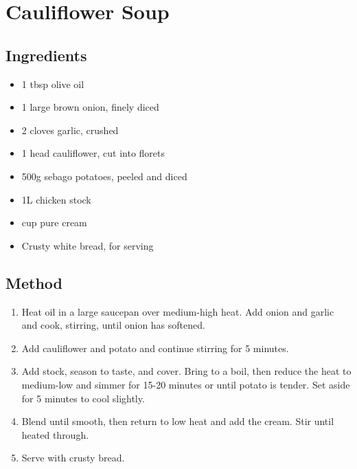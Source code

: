 \clearpage
\section{Cauliflower Soup}


\subsection{Ingredients}

\begin{itemize}
	\item 1 tbsp olive oil
	\item 1 large brown onion, finely diced
	\item 2 cloves garlic, crushed
	\item 1 head cauliflower, cut into florets
	\item 500g sebago potatoes, peeled and diced
	\item 1L chicken stock
	\item {} cup pure cream
	\item Crusty white bread, for serving
\end{itemize}

\subsection{Method}

\begin{enumerate}
	\item Heat oil in a large saucepan over medium-high heat. Add onion and garlic and cook, stirring, until onion has softened.
	\item Add cauliflower and potato and continue stirring for 5 minutes.
	\item Add stock, season to taste, and cover. Bring to a boil, then reduce the heat to medium-low and simmer for 15-20 minutes or until potato is tender. Set aside for 5 minutes to cool slightly.
	\item Blend until smooth, then return to low heat and add the cream. Stir until heated through.
	\item Serve with crusty bread.
\end{enumerate}
